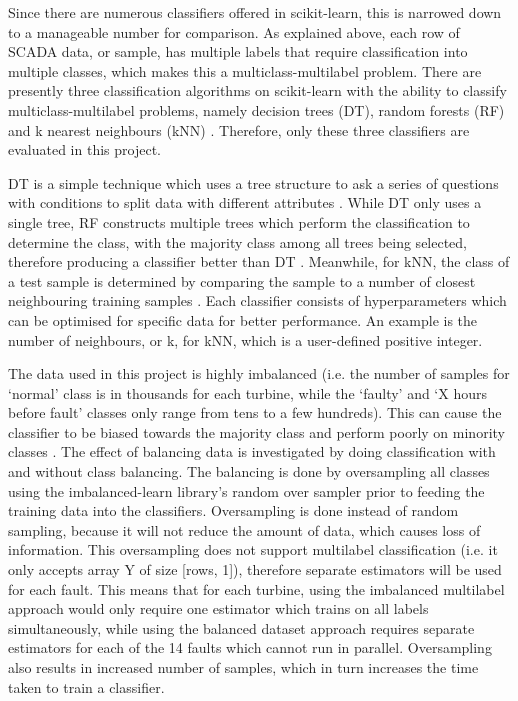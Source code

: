 Since there are numerous classifiers offered in scikit-learn, this is narrowed down to a manageable number for comparison. As explained above, each row of SCADA data, or sample, has multiple labels that require classification into multiple classes, which makes this a multiclass-multilabel problem. There are presently three classification algorithms on scikit-learn with the ability to classify multiclass-multilabel problems, namely decision trees (DT), random forests (RF) and k nearest neighbours (kNN) \cite{112}. Therefore, only these three classifiers are evaluated in this project.

DT is a simple technique which uses a tree structure to ask a series of questions with conditions to split data with different attributes \cite{Decis10}. While DT only uses a single tree, RF constructs multiple trees which perform the classification to determine the class, with the majority class among all trees being selected, therefore producing a classifier better than DT \cite{Rando}. Meanwhile, for kNN, the class of a test sample is determined by comparing the sample to a number of closest neighbouring training samples \cite{Sutto12,16N}. Each classifier consists of hyperparameters which can be optimised for specific data for better performance. An example is the number of neighbours, or k, for kNN, which is a user-defined positive integer.

The data used in this project is highly imbalanced (i.e. the number of samples for `normal' class is in thousands for each turbine, while the `faulty' and `X hours before fault' classes only range from tens to a few hundreds). This can cause the classifier to be biased towards the majority class and perform poorly on minority classes \cite{110}. The effect of balancing data is investigated by doing classification with and without class balancing. The balancing is done by oversampling all classes using the imbalanced-learn library's random over sampler \cite{Lemai} prior to feeding the training data into the classifiers. Oversampling is done instead of random sampling, because it will not reduce the amount of data, which causes loss of information. This oversampling does not support multilabel classification (i.e. it only accepts array Y of size [rows, 1]), therefore separate estimators will be used for each fault. This means that for each turbine, using the imbalanced multilabel approach would only require one estimator which trains on all labels simultaneously, while using the balanced dataset approach requires separate estimators for each of the 14 faults which cannot run in parallel. Oversampling also results in increased number of samples, which in turn increases the time taken to train a classifier.

